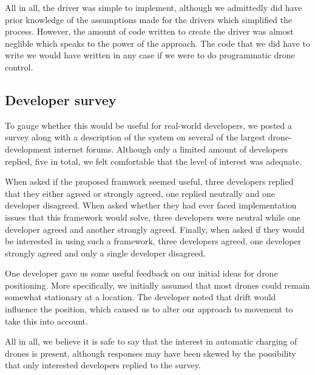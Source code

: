 All in all, the driver was simple to implement, although we admittedly did have prior knowledge of the assumptions made for the drivers which simplified the process. However, the amount of code written to create the driver was almost neglible which speaks to the power of the approach. The code that we did have to write we would have written in any case if we were to do programmatic drone control.

\subsection{Developer survey}
To gauge whether this would be useful for real-world developers, we posted a survey along with a description of the system on several of the largest drone-development internet forums. Although only a limited amount of developers replied, five in total, we felt comfortable that the level of interest was adequate. 

When asked if the proposed framwork seemed useful, three developers replied that they either agreed or strongly agreed, one replied neutrally and one developer disagreed. When asked whether they had ever faced implementation issues that this framework would solve, three developers were neutral while one developer agreed and another strongly agreed. Finally, when asked if they would be interested in using such a framework, three developers agreed, one developer strongly agreed and only a single developer disagreed.

One developer gave us some useful feedback on our initial ideas for drone positioning. More specifically, we initially assumed that most drones could remain somewhat stationary at a location. The developer noted that drift would influence the position, which caused us to alter our approach to movement to take this into account.

All in all, we believe it is safe to say that the interest in automatic charging of drones is present, although  responses may have been skewed by the possibility that only interested developers replied to the survey.

